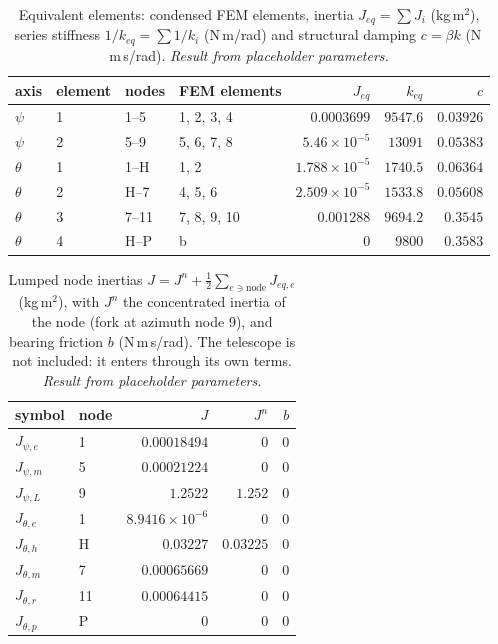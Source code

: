 \documentclass[10pt,a4paper]{article}
\numberwithin{equation}{section}
\begin{document}
\begin{table}[H]\centering\small
\caption{Equivalent elements: condensed FEM elements, inertia $J_{eq} = \sum J_i$ (kg\,m$^2$), series stiffness $1/k_{eq} = \sum 1/k_i$ (N\,m/rad) and structural damping $c = \beta k$ (N\,m\,s/rad). \emph{Result from placeholder parameters.}}\label{tab:lump_elements}
\begin{tabular}{llllrrr}\toprule
axis & element & nodes & FEM elements & $J_{eq}$ & $k_{eq}$ & $c$ \\ \midrule
$\psi$ & 1 & 1--5 & 1, 2, 3, 4 & $0.0003699$ & $9547.6$ & $0.03926$ \\
$\psi$ & 2 & 5--9 & 5, 6, 7, 8 & $5.46\times10^{-5}$ & $13091$ & $0.05383$ \\
$\theta$ & 1 & 1--H & 1, 2 & $1.788\times10^{-5}$ & $1740.5$ & $0.06364$ \\
$\theta$ & 2 & H--7 & 4, 5, 6 & $2.509\times10^{-5}$ & $1533.8$ & $0.05608$ \\
$\theta$ & 3 & 7--11 & 7, 8, 9, 10 & $0.001288$ & $9694.2$ & $0.3545$ \\
$\theta$ & 4 & H--P & b & $0$ & $9800$ & $0.3583$ \\
\bottomrule\end{tabular}\end{table}
\begin{table}[H]\centering\small
\caption{Lumped node inertias $J = J^n + \tfrac12\sum_{e\ni\text{node}}J_{eq,e}$ (kg\,m$^2$), with $J^n$ the concentrated inertia of the node (fork at azimuth node 9), and bearing friction $b$ (N\,m\,s/rad). The telescope is not included: it enters through its own terms. \emph{Result from placeholder parameters.}}\label{tab:lump_nodes}
\begin{tabular}{llrrr}\toprule
symbol & node & $J$ & $J^n$ & $b$ \\ \midrule
$J_{\psi,e}$ & 1 & $0.00018494$ & $0$ & $0$ \\
$J_{\psi,m}$ & 5 & $0.00021224$ & $0$ & $0$ \\
$J_{\psi,L}$ & 9 & $1.2522$ & $1.252$ & $0$ \\
$J_{\theta,e}$ & 1 & $8.9416\times10^{-6}$ & $0$ & $0$ \\
$J_{\theta,h}$ & H & $0.03227$ & $0.03225$ & $0$ \\
$J_{\theta,m}$ & 7 & $0.00065669$ & $0$ & $0$ \\
$J_{\theta,r}$ & 11 & $0.00064415$ & $0$ & $0$ \\
$J_{\theta,p}$ & P & $0$ & $0$ & $0$ \\
\bottomrule\end{tabular}\end{table}
\end{document}
